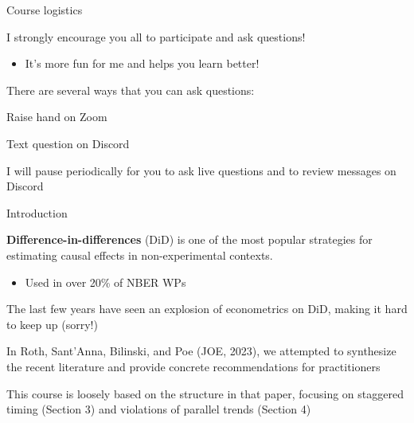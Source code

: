 \documentclass[aspectratio = 169, 12pt]{beamer}
\begin{document}
\begin{frame}{Course logistics}
  \begin{wideitemize}
    \item
    I strongly encourage you all to participate and ask questions!
    \begin{itemize}
      \item
            It's more fun for me and helps you learn better!
    \end{itemize}
    \item
    There are several ways that you can ask questions:

    \begin{wideitemize}
      \item
      Raise hand on Zoom

      \item
      Text question on Discord
    \end{wideitemize}

    \item
    I will pause periodically for you to ask live questions and to review messages on Discord
  \end{wideitemize}

\end{frame}


\begin{frame}{Introduction}
  \begin{wideitemize}
    \item
    \textbf{Difference-in-differences} (DiD) is one of the most popular strategies for estimating causal effects in non-experimental contexts.
    \medskip
    \begin{itemize}
      \item
            Used in over 20\% of NBER WPs \citep{currie_technology_2020}
    \end{itemize}

    \item
    The last few years have seen an explosion of econometrics on DiD, making it hard to keep up (sorry!)

    \item
    In Roth, Sant'Anna, Bilinski, and Poe (JOE, 2023), we attempted to synthesize the recent literature and provide concrete recommendations for practitioners


    \item
    This course is loosely based on the structure in that paper, focusing on staggered timing (Section 3) and violations of parallel trends (Section 4)
  \end{wideitemize}
\end{frame}
\end{document}
